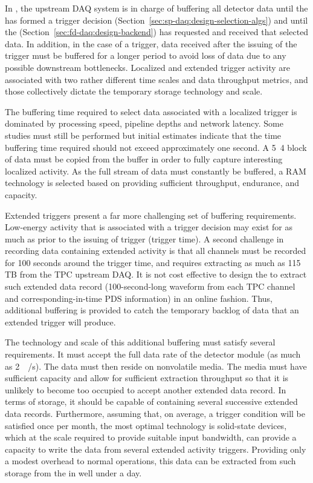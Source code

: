 In , the upstream DAQ system is in charge of buffering all
detector data until the  has formed a trigger decision
(Section~\ref{sec:sp-daq:design-selection-algs}) and until the
 (Section~\ref{sec:fd-daq:design-backend}) has requested and received that selected data. 
In addition, in the case of a  trigger, data received after
the issuing of the trigger must be buffered for a longer period to
avoid loss of data due to any possible downstream
bottlenecks. Localized and extended trigger activity are associated
with two rather different time scales and data throughput metrics, and
those collectively dictate the temporary storage technology and scale. 

The buffering time required to select data associated with a localized
trigger is dominated by processing speed, pipeline depths and network latency. Some studies must still be performed but initial estimates indicate that the time buffering time required should not exceed approximately one second. 
A  \si{5.4}{\milli\second} block of data must be copied from the buffer
in order to fully capture interesting localized activity. As the full stream of data must constantly be buffered, a RAM
technology is selected based on providing sufficient throughput,
endurance, and capacity. 

Extended triggers present a far more challenging set of buffering requirements.  
Low-energy activity that is associated with a  trigger
decision may exist for as much as \snbpretime prior to the issuing of 
trigger (trigger time).
A second challenge in recording data containing extended activity is
that all channels must be recorded for 100 seconds around the trigger
time, and requires extracting as much as 115 TB from the TPC upstream DAQ.
It is not cost effective to design the  to extract such
extended data record (100-second-long waveform from each TPC channel
and corresponding-in-time PDS information) in an online fashion. Thus, additional buffering is provided to catch
the temporary backlog of data that an extended trigger will produce.

The technology and scale of this additional buffering must satisfy several requirements. 
It must accept the full data rate of the detector module (as much as \SI{2}{\tera\byte/\second}). 
The data must then reside on nonvolatile media. 
The media must have sufficient capacity and allow for sufficient
extraction throughput so that it is unlikely 
to become too occupied to accept another extended data record. In
terms of storage, it should be capable of containing 
several successive extended data records.
Furthermore, assuming that, on average, a  trigger condition will be
satisfied once per month, the most optimal technology is %
solid-state devices, which at the scale required to provide suitable input bandwidth, can provide a capacity to write the data from several extended activity triggers.
Providing only a modest overhead to normal operations, this data can
be extracted from such storage from the  in well under a day.

